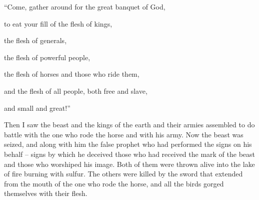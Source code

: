 {\par }{\Q “Come,
gather around
for
the great
banquet
of God,
\par }{\Q {}to
eat
your fill of the flesh
of kings,
\par }{\Q the flesh
of generals,
\par }{\Q the flesh
of powerful
people,
\par }{\Q the flesh
of horses
and
those who ride
them,
\par }{\Q and
the flesh
of all people,
both
free
and
slave,
\par }{\Q and
small
and
great!”
\par }{\PP {}Then
I saw
the beast
and
the kings
of the earth
and
their
armies
assembled
to do
battle
with
the one who rode
the horse
and
with
his
army.
Now
the beast
was seized,
and
along with
him
the
false prophet
who had performed
the
signs
on
his
behalf –
signs by
which
he deceived
those who had received
the
mark
of the
beast
and
those who worshiped
his
image.
Both
of them were thrown
alive
into
the
lake
of fire
burning
with
sulfur.
The others
were killed
by
the sword
that extended
from
the mouth
of the one who rode
the horse,
and
all
the birds
gorged
themselves with
their
flesh.

}
